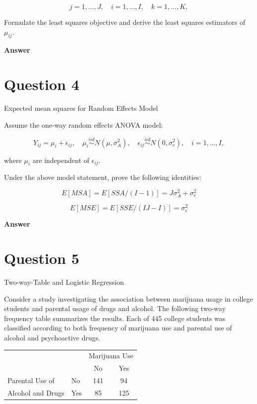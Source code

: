 \documentclass[letterpaper]{article}
\begin{document}
	\[
	j = 1, \ldots, J, \quad i = 1, \ldots, I, \quad k = 1, \ldots, K,
	\]
	
	Formulate the least squares objective and derive the least squares estimators of $\mu_{ij}$.
	
	\textbf{Answer}
	
	\clearpage
	
	\section{Question 4}
	
	{\color{deepred} Expected mean squares for Random Effects Model }
	
	Assume the one-way random effects ANOVA model:
	
	\begin{equation}
		Y_{ij} = \mu_i + \epsilon_{ij}, \quad \mu_i \overset{iid}{\sim} N(\mu, \sigma^2_A), \quad \epsilon_{ij} \overset{iid}{\sim} N(0, \sigma^2_e), \quad i = 1, \ldots, I,
	\end{equation}
	
	where $\mu_i$ are independent of $\epsilon_{ij}$.
	
	Under the above model statement, prove the following identities:
	
	\[
	E[MSA] = E[SSA/(I-1)] = J\sigma^2_A + \sigma^2_e
	\]
	
	\[
	E[MSE] = E[SSE/(IJ-I)] = \sigma^2_e
	\]
	
	\textbf{Answer}
	
	\clearpage
	
	\section{Question 5}
	
	{\color{deepred}  Two-way-Table and Logistic Regression}
	
	Consider a study investigating the association between marijuana usage in college students and parental usage of drugs and alcohol. The following two-way frequency table summarizes the results. Each of 445 college students was classified according to both frequency of marijuana use and parental use of alcohol and psychoactive drugs.
	
	\begin{table}[h]
		\centering
		\begin{tabular}{llcc}
			\hline
			& & \multicolumn{2}{c}{Marijuana Use} \\
			& & No & Yes \\
			\hline
			Parental Use of & No & 141 & 94 \\
			Alcohol and Drugs & Yes & 85 & 125 \\
			\hline
		\end{tabular}
	\end{table}
	
\end{document}

